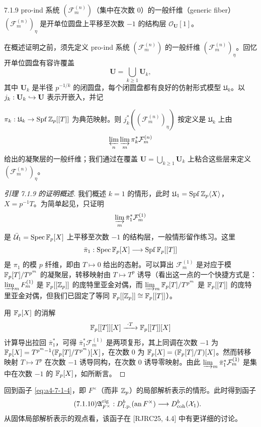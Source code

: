 \begin{lem}{7.1.9}\label{lem:a4-7-1-9}
pro-ind 系统 $(\mathcal F^{(n)}_m)$（集中在次数 0）的一般纤维（generic fiber）$(\mathcal F^{(n)}_m)_\eta$ 是开单位圆盘上平移至次数 $-1$ 的结构层 $\mathcal O_{\mathbf U}[1]$。
\end{lem}

在概述证明之前，须先定义 pro-ind 系统 $(\mathcal F^{(n)}_m)$ 的一般纤维 $(\mathcal F^{(n)}_m)_\eta$。回忆开单位圆盘有容许覆盖
\[
\mathbf U=\bigcup_{k\ge1}\mathbf U_k,
\]
其中 $\mathbf U_k$ 是半径 $p^{-1/k}$ 的闭圆盘，每个闭圆盘都有良好的仿射形式模型 $\mathfrak U_k$。以 $j_k:\mathbf U_k\hookrightarrow\mathbf U$ 表示开嵌入，并记

$\pi_k:\mathfrak U_k\to\operatorname{Spf}\mathbb{Z}_p[[T]]$ 为典范映射。则 $j_k^*((\mathcal F^{(n)}_m)_\eta)$ 按定义是 $\mathfrak U_k$ 上由
\[
\varprojlim_n\varinjlim_m\pi_k^*\mathcal F^{(n)}_m
\]
给出的凝聚层的一般纤维；我们通过在覆盖 $\mathbf U=\bigcup_{k\ge1}\mathbf U_k$ 上粘合这些层来定义 $(\mathcal F^{(n)}_m)_\eta$。

\begin{proof}[引理 7.1.9 的证明概述]
我们概述 $k=1$ 的情形，此时 $\mathfrak U_1=\operatorname{Spf}\mathbb{Z}_p\langle X\rangle$，$X=p^{-1}T$。为简单起见，只证明
\[
\varinjlim_m\bar\pi_1^*\mathcal F^{(1)}_m
\]
是 $\bar{\mathcal U}_1=\operatorname{Spec}\mathbb{F}_p[X]$ 上平移至次数 $-1$ 的结构层，一般情形留作练习。这里
\[
\bar\pi_1:\operatorname{Spec}\mathbb{F}_p[X]\longrightarrow\operatorname{Spf}\mathbb{F}_p[[T]]
\]
是 $\pi_1$ 的模 $p$ 纤维，即由 $T\mapsto0$ 给出的态射。可以算出 $\mathcal F^{(1)}_m$ 是对应于模 $\mathbb{F}_p[T]/T^{p^m}$ 的凝聚层，转移映射由 $T\mapsto T^p$ 诱导（看出这一点的一个快捷方式是：$\varinjlim_mF^{(1)}_m$ 是 $\mathbb{F}_p[[\mathbb{Z}_p]]$ 的庞特里亚金对偶，而 $\varinjlim_m\mathbb{F}_p[T]/T^{p^m}$ 是 $\mathbb{F}_p[[T]]$ 的庞特里亚金对偶，但我们已固定了等同 $\mathbb{F}_p[[\mathbb{Z}_p]]\cong\mathbb{F}_p[[T]]$）。

用 $\mathbb{F}_p[X]$ 的消解
\[
\F_p[[T]][X]\xrightarrow{\ \cdot T\ }\F_p[[T]][X]
\]
计算导出拉回 $\bar\pi_1^*$，可得 $\bar\pi_1^*\mathcal F^{(1)}_m$ 是两项复形，其上同调在次数 $-1$ 为 $\mathbb{F}_p[X]=T^{p^m-1}(\mathbb{F}_p[T]/T^{p^m})[X]$，在次数 0 为 $\mathbb{F}_p[X]=(\mathbb{F}_p[T]/T)[X]$。然而转移映射 $T\mapsto T^p$ 在次数 $-1$ 诱导同构，在次数 0 诱导零映射。由此 $\varinjlim_m\bar\pi_1^*\mathcal F^{(1)}_m$ 是集中在次数 $-1$ 的 $\mathbb{F}_p[X]$，如所断言。
\end{proof}

回到函子 \eqref{eq:a4-7-1-4}，即 $F^\times$（而非 $\mathbb{Z}_p$）的局部解析表示的情形。此时得到函子
\begin{equation}\tag{7.1.10}\label{eq:a4-7-1-10}
\mathfrak A^{\mathrm{rig}}_{F^\times}:D^b_{\mathrm{f.p.}}(\mathrm{an}\,F^\times)\longrightarrow D^b_{\mathrm{coh}}(\mathcal X_1).
\end{equation}
从固体局部解析表示的观点看，该函子在 [RJRC25, 4.4] 中有更详细的讨论。

